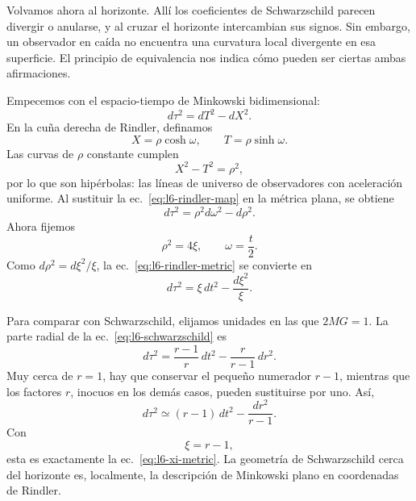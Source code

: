 Volvamos ahora al horizonte. Allí los coeficientes de Schwarzschild parecen divergir o anularse, y al cruzar el horizonte intercambian sus signos. Sin embargo, un observador en caída no encuentra una curvatura local divergente en esa superficie. El principio de equivalencia nos indica cómo pueden ser ciertas ambas afirmaciones.

Empecemos con el espacio-tiempo de Minkowski bidimensional:
\begin{equation}
d\tau^{2}=dT^{2}-dX^{2}.
\end{equation}
En la cuña derecha de Rindler, definamos
\begin{equation}
X=\rho\cosh\omega,
\qquad
T=\rho\sinh\omega.
\label{eq:l6-rindler-map}
\end{equation}
Las curvas de \(\rho\) constante cumplen
\begin{equation}
X^{2}-T^{2}=\rho^{2},
\end{equation}
por lo que son hipérbolas: las líneas de universo de observadores con aceleración uniforme. Al sustituir la ec.~\eqref{eq:l6-rindler-map} en la métrica plana, se obtiene
\begin{equation}
d\tau^{2}
=\rho^{2}d\omega^{2}-d\rho^{2}.
\label{eq:l6-rindler-metric}
\end{equation}
Ahora fijemos
\begin{equation}
\rho^{2}=4\xi,
\qquad
\omega=\frac{t}{2}.
\label{eq:l6-rindler-rescale}
\end{equation}
Como \(d\rho^{2}=d\xi^{2}/\xi\), la ec.~\eqref{eq:l6-rindler-metric} se convierte en
\begin{equation}
d\tau^{2}
=\xi\,dt^{2}-\frac{d\xi^{2}}{\xi}.
\label{eq:l6-xi-metric}
\end{equation}

\begin{classroomqa}
\end{classroomqa}

Para comparar con Schwarzschild, elijamos unidades en las que \(2MG=1\). La parte radial de la ec.~\eqref{eq:l6-schwarzschild} es
\begin{equation}
d\tau^{2}
=
\frac{r-1}{r}\,dt^{2}
-
\frac{r}{r-1}\,dr^{2}.
\end{equation}
Muy cerca de \(r=1\), hay que conservar el pequeño numerador \(r-1\), mientras que los factores \(r\), inocuos en los demás casos, pueden sustituirse por uno. Así,
\begin{equation}
d\tau^{2}
\simeq
(r-1)\,dt^{2}
-
\frac{dr^{2}}{r-1}.
\end{equation}
Con
\begin{equation}
\xi=r-1,
\end{equation}
esta es exactamente la ec.~\eqref{eq:l6-xi-metric}. La geometría de Schwarzschild cerca del horizonte es, localmente, la descripción de Minkowski plano en coordenadas de Rindler.


